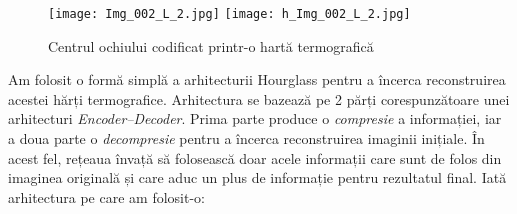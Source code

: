 \begin{figure}[h]
    \centering
    \texttt{[image: Img\_002\_L\_2.jpg]}
    \texttt{[image: h\_Img\_002\_L\_2.jpg]}
    \caption{Centrul ochiului codificat printr-o hartă termografică}
\end{figure}

Am folosit o formă simplă a arhitecturii Hourglass pentru a încerca reconstruirea acestei hărți termografice.
Arhitectura se bazează pe 2 părți corespunzătoare unei arhitecturi \emph{Encoder–Decoder}.
Prima parte produce o \emph{compresie} a informației, iar a doua parte o \emph{decompresie} pentru a încerca reconstruirea imaginii inițiale.
În acest fel, rețeaua învață să folosească doar acele informații care sunt de folos din imaginea originală și care aduc un plus de informație pentru rezultatul final.
Iată arhitectura pe care am folosit-o:

